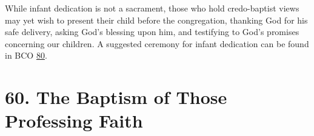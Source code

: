 \documentclass[
]{book}
\begin{document}
\protect\hypertarget{chapter-slug-59-a-note-on-infant-dedication}{\href{}{}}

\protect\hypertarget{59}{\href{}{}}While infant dedication is not a sacrament, those who hold credo-baptist views may yet wish to present their child before the congregation, thanking God for his safe delivery, asking God's blessing upon him, and testifying to God's promises concerning our children. A suggested ceremony for infant dedication can be found in BCO \protect\hyperlink{80}{80}.

\hypertarget{the-baptism-of-those-professing-faith}{%
\section*{60. The Baptism of Those Professing Faith}\label{the-baptism-of-those-professing-faith}}

\protect\hypertarget{chapter-slug-60-the-baptism-of-those-professing-faith}{\href{}{}}
\end{document}
